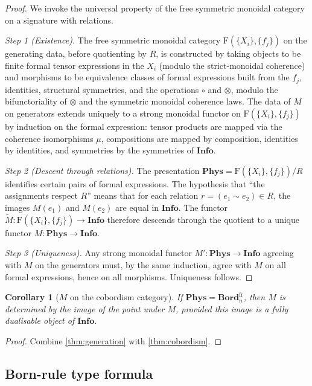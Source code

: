 \documentclass[12pt]{article}
\newtheorem{corollary}[theorem]{Corollary}
\theoremstyle{definition}
\theoremstyle{remark}
\newcommand{\Phys}{\mathbf{Phys}}
\newcommand{\Info}{\mathbf{Info}}
\newcommand{\Bord}{\mathbf{Bord}}
\begin{document}
\begin{proof}
We invoke the universal property of the free symmetric monoidal category on a signature with relations.

\emph{Step 1 (Existence).} The free symmetric monoidal category $\mathrm{F}(\{X_i\}, \{f_j\})$ on the generating data, before quotienting by $R$, is constructed by taking objects to be finite formal tensor expressions in the $X_i$ (modulo the strict-monoidal coherence) and morphisms to be equivalence classes of formal expressions built from the $f_j$, identities, structural symmetries, and the operations $\circ$ and $\otimes$, modulo the bifunctoriality of $\otimes$ and the symmetric monoidal coherence laws. The data of $M$ on generators extends uniquely to a strong monoidal functor on $\mathrm{F}(\{X_i\}, \{f_j\})$ by induction on the formal expression: tensor products are mapped via the coherence isomorphisms $\mu$, compositions are mapped by composition, identities by identities, and symmetries by the symmetries of $\Info$.

\emph{Step 2 (Descent through relations).} The presentation $\Phys = \mathrm{F}(\{X_i\}, \{f_j\}) / R$ identifies certain pairs of formal expressions. The hypothesis that ``the assignments respect $R$'' means that for each relation $r = (e_1 \sim e_2) \in R$, the images $M(e_1)$ and $M(e_2)$ are equal in $\Info$. The functor $\widetilde{M} : \mathrm{F}(\{X_i\}, \{f_j\}) \to \Info$ therefore descends through the quotient to a unique functor $M : \Phys \to \Info$.

\emph{Step 3 (Uniqueness).} Any strong monoidal functor $M' : \Phys \to \Info$ agreeing with $M$ on the generators must, by the same induction, agree with $M$ on all formal expressions, hence on all morphisms. Uniqueness follows.
\end{proof}

\begin{corollary}[$M$ on the cobordism category]
\label{cor:M-on-cob}
If $\Phys = \Bord_n^{\mathrm{fr}}$, then $M$ is determined by the image of the point under $M$, provided this image is a fully dualisable object of $\Info$.
\end{corollary}

\begin{proof}
Combine \cref{thm:generation} with \cref{thm:cobordism}.
\end{proof}

\subsection{Born-rule type formula}
\end{document}
